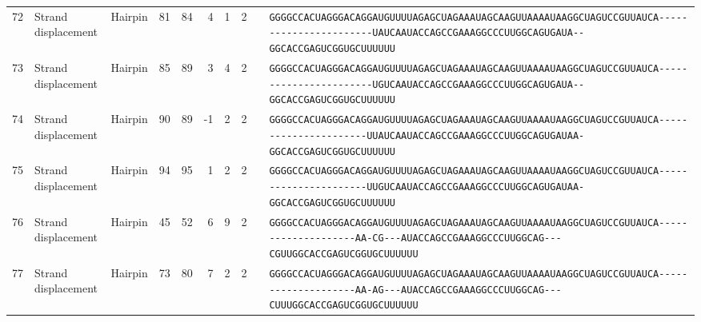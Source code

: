 \begin{tabular}{rllrrrrrcl}
 72 & Strand displacement & Hairpin & 81 & 84 & 4 & 1 & 2 &  &
 \color{ucsfblack}\verb|GGGGCCACUAGGGACAGGAU|\color{ucsfblue}\verb|GUUUUAGAGCUAGAAAUAGCAAGUUAAAAU|\color{ucsfnavy}\verb|AAGGCUAGUCCGU|\color{ucsfteal}\verb|UAUCA-----------------------UAUCA|\color{ucsfpurple}\verb|AUACCAGCCGAAAGGCCCUUGGCAG|\color{ucsfteal}\verb|UGAUA--GGCACCGAGUCGGUGC|\color{ucsfblack}\verb|UUUUUU| \\

 73 & Strand displacement & Hairpin & 85 & 89 & 3 & 4 & 2 &  &
 \color{ucsfblack}\verb|GGGGCCACUAGGGACAGGAU|\color{ucsfblue}\verb|GUUUUAGAGCUAGAAAUAGCAAGUUAAAAU|\color{ucsfnavy}\verb|AAGGCUAGUCCGU|\color{ucsfteal}\verb|UAUCA-----------------------UGUCA|\color{ucsfpurple}\verb|AUACCAGCCGAAAGGCCCUUGGCAG|\color{ucsfteal}\verb|UGAUA--GGCACCGAGUCGGUGC|\color{ucsfblack}\verb|UUUUUU| \\

 74 & Strand displacement & Hairpin & 90 & 89 & -1 & 2 & 2 &  &
 \color{ucsfblack}\verb|GGGGCCACUAGGGACAGGAU|\color{ucsfblue}\verb|GUUUUAGAGCUAGAAAUAGCAAGUUAAAAU|\color{ucsfnavy}\verb|AAGGCUAGUCCGU|\color{ucsfteal}\verb|UAUCA----------------------UUAUCA|\color{ucsfpurple}\verb|AUACCAGCCGAAAGGCCCUUGGCAG|\color{ucsfteal}\verb|UGAUAA-GGCACCGAGUCGGUGC|\color{ucsfblack}\verb|UUUUUU| \\

 75 & Strand displacement & Hairpin & 94 & 95 & 1 & 2 & 2 &  &
 \color{ucsfblack}\verb|GGGGCCACUAGGGACAGGAU|\color{ucsfblue}\verb|GUUUUAGAGCUAGAAAUAGCAAGUUAAAAU|\color{ucsfnavy}\verb|AAGGCUAGUCCGU|\color{ucsfteal}\verb|UAUCA----------------------UUGUCA|\color{ucsfpurple}\verb|AUACCAGCCGAAAGGCCCUUGGCAG|\color{ucsfteal}\verb|UGAUAA-GGCACCGAGUCGGUGC|\color{ucsfblack}\verb|UUUUUU| \\

 76 & Strand displacement & Hairpin & 45 & 52 & 6 & 9 & 2 &  &
 \color{ucsfblack}\verb|GGGGCCACUAGGGACAGGAU|\color{ucsfblue}\verb|GUUUUAGAGCUAGAAAUAGCAAGUUAAAAU|\color{ucsfnavy}\verb|AAGGCUAGUCCGU|\color{ucsfteal}\verb|UAUCA--------------------AA-CG---|\color{ucsfpurple}\verb|AUACCAGCCGAAAGGCCCUUGGCAG|\color{ucsfteal}\verb|---CGUUGGCACCGAGUCGGUGC|\color{ucsfblack}\verb|UUUUUU| \\

 77 & Strand displacement & Hairpin & 73 & 80 & 7 & 2 & 2 &  &
 \color{ucsfblack}\verb|GGGGCCACUAGGGACAGGAU|\color{ucsfblue}\verb|GUUUUAGAGCUAGAAAUAGCAAGUUAAAAU|\color{ucsfnavy}\verb|AAGGCUAGUCCGU|\color{ucsfteal}\verb|UAUCA--------------------AA-AG---|\color{ucsfpurple}\verb|AUACCAGCCGAAAGGCCCUUGGCAG|\color{ucsfteal}\verb|---CUUUGGCACCGAGUCGGUGC|\color{ucsfblack}\verb|UUUUUU| \\


\end{tabular}
